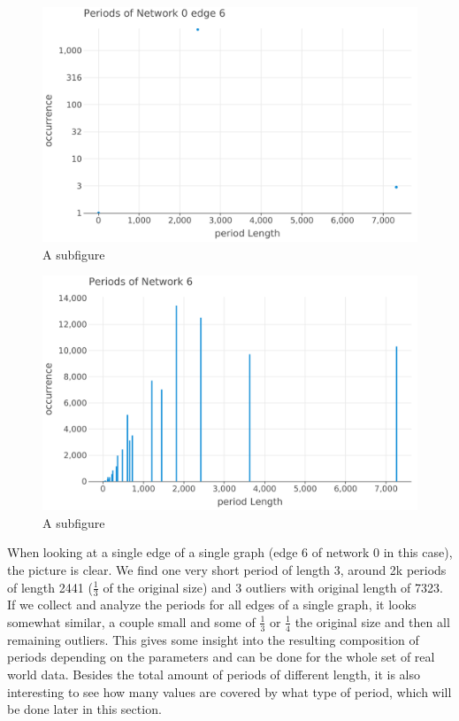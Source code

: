 \begin{figure}[!htb]
	\centering
	\begin{minipage}{.5\textwidth}
		\centering
		\includegraphics[width=\linewidth]{charts/introduction/test-edge-plot-log.png}
		\\ A subfigure
		\label{fig:intro-edge-plot}
	\end{minipage}%
	\begin{minipage}{0.5\textwidth}
		\centering
		\includegraphics[width=\linewidth]{charts/introduction/test-graph-plot.png}
		\\ A subfigure
		\label{fig:intro-graph-plot}
	\end{minipage}
\end{figure}

When looking at a single edge of a single graph (edge 6 of network 0 in this case), the picture is clear. We find one very short period of length 3, around 2k periods of length 2441 ($\frac{1}{3}$ of the original size) and 3 outliers with original length of 7323. If we collect and analyze the periods for all edges of a single graph, it looks somewhat similar, a couple small and some of $\frac{1}{3}$ or $\frac{1}{4}$ the original size and then all remaining outliers.  This gives some insight into the resulting composition of periods depending on the parameters and can be done for the whole set of real world data. Besides the total amount of periods of different length, it is also interesting to see how many values are covered by what type of period, which will be done later in this section.

